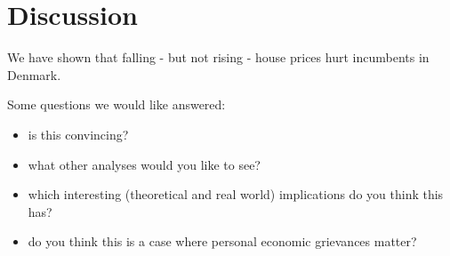 \documentclass[aspectratio=169]{beamer}
\begin{document}
\section{Discussion}

	\begin{frame}
	We have shown that falling - but not rising - house prices hurt incumbents in Denmark.
	
	\vspace{0.2in}
	
	Some questions we would like answered:
	\begin{itemize}
		\item is this convincing?
		\item what other analyses would you like to see?
		\item which interesting (theoretical and real world) implications do you think this has?
		\item do you think this is a case where personal economic grievances matter? 
	\end{itemize}	
		
	\end{frame}		

\begin{frame}
	
		
\end{frame}
\end{document}
